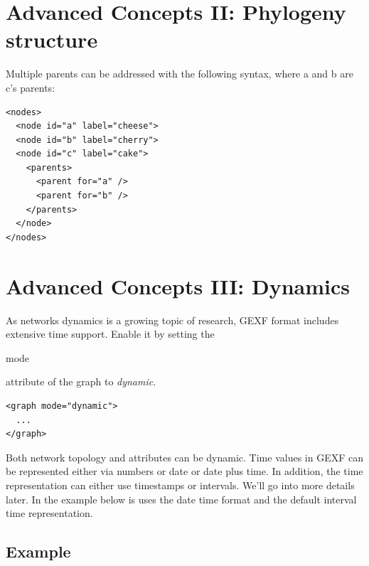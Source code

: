 \documentclass[a4paper,10pt]{article}
\begin{document}
\section{Advanced Concepts II: Phylogeny structure} \label{phylogeny}

Multiple parents can be addressed with the following syntax, where a and b are c's parents:
\lstset{ style=gexf }
\begin{lstlisting}[caption={Multiple parents},label=phylogeny1]
<nodes>
  <node id="a" label="cheese">
  <node id="b" label="cherry">
  <node id="c" label="cake">
    <parents>
      <parent for="a" />
      <parent for="b" />
    </parents>
  </node>
</nodes>
\end{lstlisting}

\section{Advanced Concepts III: Dynamics} \label{dynamics}

As networks dynamics is a growing topic of research, GEXF format includes extensive time support. Enable it by setting the \begin{footnotesize}mode\end{footnotesize} attribute of the graph to \textit{dynamic}.

\lstset{ style=gexf }
\begin{lstlisting}[caption={Dynamic Enabled!},label=dynamicEnabled]
<graph mode="dynamic">
  ...
</graph>
\end{lstlisting}

Both network topology and attributes can be dynamic. Time values in GEXF can be represented either via numbers or date or date plus time. In addition, the time representation can either use timestamps or intervals. We'll go into more details later. In the example below is uses the date time format and the default interval time representation.

\subsection{Example}
\end{document}

